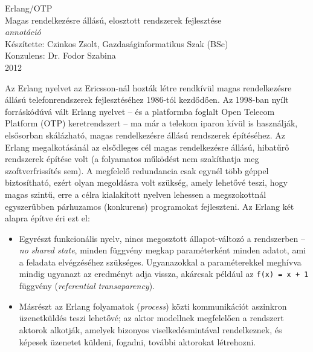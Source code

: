 \documentclass[12pt, a4paper, oneside]{book}
\begin{document}
\fancyhead[LR]{}
\titlepage
\begin{center}
\Large{Erlang/OTP}\\
\vspace{0.3cm}
\large{Magas rendelkezésre állású, elosztott rendszerek
fejlesztése}\\
\vspace{0.5cm}
\emph{annotáció}\\
\vspace{0.5cm}
{\small Készítette: Czinkos Zsolt, Gazdaságinformatikus Szak (BSc)}\\
\vspace{0.2cm}
{\small Konzulens: Dr. Fodor Szabina}\\
\vspace{0.5cm}
{\small 2012}
\vspace{1.5cm}
\end{center}

\onehalfspacing

Az Erlang nyelvet az Ericsson-nál hozták létre rendkívül magas rendelkezésre
állású telefonrendszerek fejlesztéséhez 1986-tól kezdődően. Az 1998-ban nyílt
forráskódúvá vált Erlang nyelvet -- és a platformba foglalt Open Telecom
Platform (OTP) keretrendszert -- ma már a telekom iparon kívül is használják,
elsősorban skálázható, magas rendelkezésre állású rendszerek építéséhez. Az
Erlang megalkotásánál az elsődleges cél magas rendelkezésre állású, hibatűrő
rendszerek építése volt (a folyamatos működést nem szakíthatja meg
szoftverfrissítés sem). A megfelelő redundancia csak egynél több géppel
biztosítható, ezért olyan megoldásra volt szükség, amely lehetővé teszi, hogy
magas szintű, erre a célra kialakított nyelven lehessen a megszokottnál
egyszerűbben párhuzamos (konkurens) programokat fejleszteni. Az Erlang két
alapra építve éri ezt el: 

\begin{itemize}
\item Egyrészt funkcionális nyelv, nincs megosztott állapot-változó a
rendszerben -- \emph{no shared state}, minden függvény megkap paraméterként
minden adatot, ami a feladata elvégzéséhez szükséges. Ugyanazokkal a
paraméterekkel meghívva mindig ugyanazt az eredményt adja vissza, akárcsak
például az \texttt{f(x) = x + 1} függvény (\emph{referential transaparency}).
\item Másrészt az Erlang folyamatok (\emph{process}) közti kommunikációt
aszinkron üzenetküldés teszi lehetővé; az aktor modellnek megfelelően
a rendszert aktorok alkotják, amelyek bizonyos viselkedésmintával rendelkeznek,
és képesek üzenetet küldeni, fogadni, további aktorokat létrehozni.
\end{itemize}
\end{document}
